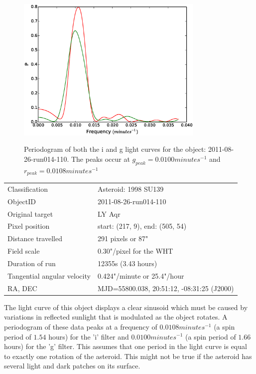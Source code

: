 \begin{figure}
  \center
  \includegraphics[width=90mm]{images/2011-08-26-run014-110-pgram-bin4.eps} 
  \label{fig:2013-07-21-run010-23}
  \caption{Periodogram of both the i and g light curves for the object: 2011-08-26-run014-110. The peaks occur at $g_{peak} = 0.0100 minutes^{-1}$ and  $r_{peak} = 0.0108 minutes^{-1}$ }
\end{figure}


\begin{tabular}{l l}
  Classification & Asteroid: 1998 SU139 \\
  ObjectID & 2011-08-26-run014-110 \\
  Original target & LY Aqr \\
  Pixel position & start: (217, 9), end: (505, 54) \\
  Distance travelled & 291 pixels or 87" \\
  Field scale & 0.30"/pixel for the WHT\\
  Duration of run & 12355s (3.43 hours) \\
  Tangential angular velocity & 0.424"/minute or 25.4"/hour\\ 
  RA, DEC & MJD=55800.038, 20:51:12, -08:31:25 (J2000) \\
\end{tabular}


The light curve of this object displays a clear sinusoid which must be caused by variations in reflected sunlight that is modulated as the object rotates. A periodogram of these data peaks at a frequency of $0.0108 minutes^{-1}$ (a spin period of $1.54$ hours) for the 'i' filter and $0.0100 minutes^{-1}$ (a spin period of $1.66$ hours) for the 'g' filter. This assumes that one period in the light curve is equal to exactly one rotation of the asteroid. This might not be true if the asteroid has several light and dark patches on its surface. 


